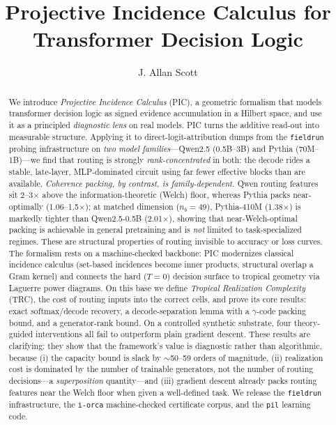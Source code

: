 \documentclass[sigconf,nonacm]{acmart}
\theoremstyle{definition}
\newcommand{\nb}{n_b}
\begin{document}
\title{Projective Incidence Calculus for Transformer Decision Logic}

\author{J. Allan Scott}

\renewcommand{\shortauthors}{J. Allan Scott}

\begin{abstract}
We introduce \emph{Projective Incidence Calculus} (PIC), a geometric formalism that
models transformer decision logic as signed evidence accumulation in a Hilbert
space, and use it as a principled \emph{diagnostic lens} on real models. PIC turns
the additive read-out into measurable structure. Applying it to
direct-logit-attribution dumps from the \texttt{fieldrun} probing infrastructure on
\emph{two model families}---Qwen2.5 (0.5B--3B) and Pythia (70M--1B)---we find that
routing is strongly \emph{rank-concentrated} in both: the decode rides a stable,
late-layer, MLP-dominated circuit using far fewer effective blocks than are
available. \emph{Coherence packing, by contrast, is family-dependent.} Qwen routing
features sit 2--3$\times$ above the information-theoretic (Welch) floor, whereas
Pythia packs near-optimally (1.06--1.5$\times$); at matched dimension ($\nb{=}49$),
Pythia-410M (1.38$\times$) is markedly tighter than Qwen2.5-0.5B (2.01$\times$),
showing that near-Welch-optimal packing is achievable in general pretraining and is
\emph{not} limited to task-specialized regimes. These are structural properties of
routing invisible to accuracy or loss curves.
%
The formalism rests on a machine-checked backbone: PIC modernizes classical
incidence calculus (set-based incidences become inner products, structural overlap a
Gram kernel) and connects the hard ($T{=}0$) decision surface to tropical geometry
via Laguerre power diagrams. On this base we define \emph{Tropical Realization
Complexity} (TRC), the cost of routing inputs into the correct cells, and prove its
core results: exact softmax/decode recovery, a decode-separation lemma with a
$\gamma$-code packing bound, and a generator-rank bound.
%
On a controlled synthetic substrate, four theory-guided interventions all fail to
outperform plain gradient descent. These results are clarifying: they show that the
framework's value is diagnostic rather than algorithmic, because (i) the capacity
bound is slack by $\sim$50--59 orders of magnitude, (ii) realization cost is
dominated by the number of trainable generators, not the number of routing
decisions---a \emph{superposition} quantity---and (iii) gradient descent already
packs routing features near the Welch floor when given a well-defined task. We
release the \texttt{fieldrun}
infrastructure, the \texttt{i-orca} machine-checked certificate corpus, and the
\texttt{pil} learning code.
\end{abstract}
\end{document}
